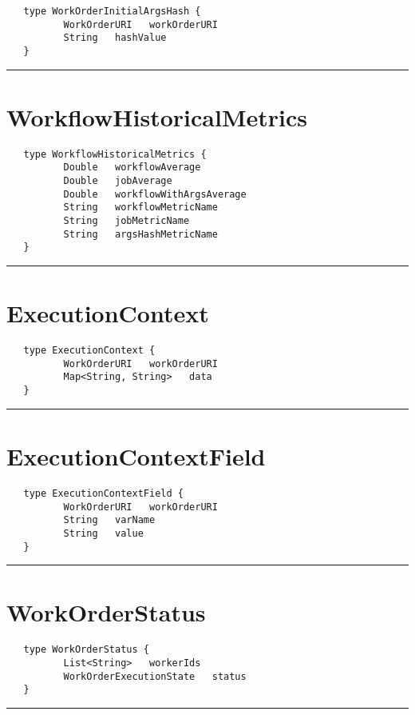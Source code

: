 \begin{verbatim}
   type WorkOrderInitialArgsHash {
          WorkOrderURI   workOrderURI
          String   hashValue
   }
\end{verbatim}

\rule{15cm}{2pt}
\section{WorkflowHistoricalMetrics}
\label{type:WorkflowHistoricalMetrics}

\begin{verbatim}
   type WorkflowHistoricalMetrics {
          Double   workflowAverage
          Double   jobAverage
          Double   workflowWithArgsAverage
          String   workflowMetricName
          String   jobMetricName
          String   argsHashMetricName
   }
\end{verbatim}

\rule{15cm}{2pt}
\section{ExecutionContext}
\label{type:ExecutionContext}

\begin{verbatim}
   type ExecutionContext {
          WorkOrderURI   workOrderURI
          Map<String, String>   data
   }
\end{verbatim}

\rule{15cm}{2pt}
\section{ExecutionContextField}
\label{type:ExecutionContextField}

\begin{verbatim}
   type ExecutionContextField {
          WorkOrderURI   workOrderURI
          String   varName
          String   value
   }
\end{verbatim}

\rule{15cm}{2pt}
\section{WorkOrderStatus}
\label{type:WorkOrderStatus}

\begin{verbatim}
   type WorkOrderStatus {
          List<String>   workerIds
          WorkOrderExecutionState   status
   }
\end{verbatim}

\rule{15cm}{2pt}
